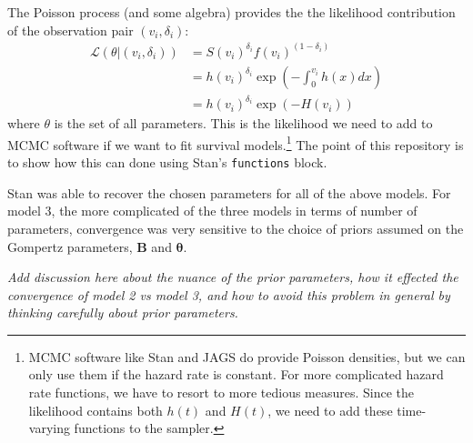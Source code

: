 \documentclass[12pt]{article}
\renewcommand{\vec}{\boldsymbol}
\begin{document}
The Poisson process (and some algebra) provides the the likelihood
contribution of the observation pair $(v_i, \delta_i)$:
\begin{align*}
\mathcal{L}\left(\theta |(v_i,\delta_i) \right)
&= S(v_i)^{\delta_i} f(v_i)^{(1-\delta_i)} \\
&= h(v_i)^{\delta_i} \exp{\left( - \int_0^{v_i}{h(x)dx} \right)} \\
&= h(v_i)^{\delta_i} \exp{\left( - H(v_i) \right)}
\end{align*}
where $\theta$ is the set of all parameters. This is the likelihood we
need to add to MCMC software if we want to fit survival
models.\footnote{MCMC software like Stan and JAGS do provide Poisson
  densities, but we can only use them if the hazard rate is constant.
  For more complicated hazard rate functions, we have to resort to more
  tedious measures. Since the likelihood contains both $h(t)$ and $H(t)$, we need to add these time-varying functions to the sampler.} The point of this repository is to show how this can done using Stan's \texttt{functions} block.

Stan was able to recover the chosen parameters for all of the above
models. For model 3, the more complicated of the three models in terms
of number of parameters, convergence was very sensitive to the choice of
priors assumed on the Gompertz parameters, $\vec{B}$ and
$\vec{\theta}$.

\emph{Add discussion here about the nuance of the prior parameters, how
it effected the convergence of model 2 vs model 3, and how to avoid this
problem in general by thinking carefully about prior parameters.}
\end{document}
